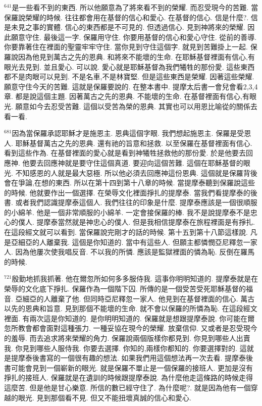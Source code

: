 \documentclass{book}
\begin{document}
$^{641}$是一些看不到的東西.
所以他願意為了將來看不到的榮耀.
而忍受現今的苦難.
當保羅說榮耀的時候.
往往都會用在基督的信心和愛心.
在基督的信心.
信是什麼?.
信是未見之事的實體.
信心的東西都是不可見的.
但透過信心.
見到神將來的榮耀.
因此願意守住.
最後這一字.
保羅用守住.
你要用基督的信心和愛心守住.
從前的善導.
你要靠著住在裡面的聖靈牢牢守住.
當你見到守住這個字.
就見到苦難掛上一起.
保羅說因為他見到萬古之先的恩典.
和將來不能壞的生命.
在耶穌基督裡面有信心,有眼光去見到.
並且愛心.
可以說.
愛心就是耶穌基督為我們犧牲的那份愛.
這些東西都不是肉眼可以見到.
不是名車,不是林寶堅.
但是這些東西是榮耀.
因著這些榮耀.
願意守住今天的苦難.
這就是保羅要說的.
在整本書中.
提摩太后書一會兒會看2,3,4章.
都是說這個主題.
因著萬古之先的恩典.
不能壞的生命.
在基督裡面有信心,有眼光.
願意如今去忍受苦難.
這個以受苦為榮的恩典.
其實也可以用恩比喻從的關係去看一看.

$^{681}$因為當保羅承認耶穌才是施恩主.
恩典這個字眼.
我們想起施恩主.
保羅是受恩人.
耶穌基督萬古之先的恩典.
還有祂的旨意和拯救.
以至保羅在基督裡面有信心.
看到這些作為.
在基督裡面的愛心就是看到神犧牲拯救他的那份愛.
於是他要去回應神.
他要去回應神就是要守住這個真道.
要迎向這個苦難.
這個在耶穌基督的眼光.
不知感恩的人就是最大惡極.
所以他必須去回應神這份恩典.
這個就是保羅背後會在爭論,在想的東西.
所以在第十四到第十八章的時候.
當提摩泰聽到保羅說這些的時候.
他就要作出一個選擇.
在榮辱文化裡面掙扎的提摩泰.
當我們看提摩泰的後書.
或者我們認識提摩泰這個人.
我們往往的印象是什麼.
提摩泰應該是一個很順服的小綿羊.
他是一個非常順服的小綿羊.
一定會接保羅的棒.
我不是說提摩泰不是忠心的僕人.
提摩泰當然就是神忠心的僕人.
但是我相信提摩泰在旅程裡面是有掙扎.
在這段經文就可以看到.
當保羅說完剛才的話的時候.
第十五到第十八節這樣說.
凡是亞細亞的人離棄我.
這個是你知道的.
當中有這些人.
但願主都憐憫亞尼釋忽一家人.
因為他屢次使我唱反音.
不以我的所憐.
應該是監獄裡面的憐為恥.
反倒在羅馬的時候.

$^{721}$殷勤地抓我抓著.
他在爾忽所如何多多服侍我.
這事你明明知道的.
提摩泰就是在榮辱的文化底下掙扎.
保羅作為一個階下囚.
所傳的是一個受苦受死耶穌基督的福音.
亞細亞的人離棄了他.
但同時亞尼釋忽一家人.
他見到在基督裡面的信心.
萬古以先的恩典和旨意.
見到那個不能壞的生命.
就不會以保羅的所憐為恥.
在這段經文裡面.
有兩次這是你知道的.
是你明明知道的.
保羅就是想跟提摩泰說.
你可能在爾忽所教會都會面對這種張力.
一種妥協在現今的榮耀.
放棄信仰.
又或者是忍受現今的羞辱.
而去追求將來榮耀的角力.
保羅說兩個版樣你都見到.
你見到哪些人出賣我.
你見到哪些人服侍我.
你要去選擇.
你知的,兩樣你都知的.
你要選擇對的.
這就是提摩泰後書寫的一個很有趣的想法.
如果我們用這個想法再一次去看.
提摩泰後書可能會見到一個嶄新的眼光.
就是保羅不單止是一個保羅的接班人.
更加是沒有掙扎的接班人.
保羅就是在遺訓的時候跟提摩泰說.
為什麼他走這條路的時候走得這麼苦.
但是他是甘心樂意.
所信的數已經守住了.
為什麼呢?.
就是因為他有一個穿越的眼光.
見到那個看不見.
但又不能扭壞真誠的信心和愛心.
\end{document}
